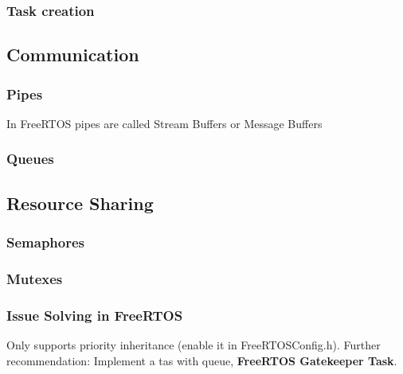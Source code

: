\subsubsection{Task creation}



\subsection{Communication}
\subsubsection{Pipes}
In FreeRTOS pipes are called Stream Buffers or Message Buffers

\subsubsection{Queues}



\subsection{Resource Sharing}

\subsubsection{Semaphores}


\subsubsection{Mutexes}


\subsubsection{Issue Solving in FreeRTOS}
Only supports priority inheritance (enable it in FreeRTOSConfig.h).
Further recommendation: Implement a tas with queue, \textbf{FreeRTOS Gatekeeper Task}.